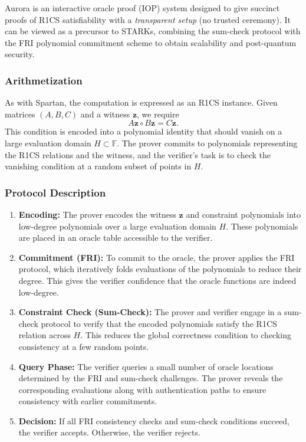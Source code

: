 Aurora is an interactive oracle proof (IOP) system designed to give succinct proofs of R1CS satisfiability with a \emph{transparent setup} (no trusted ceremony). 
It can be viewed as a precursor to STARKs, combining the sum-check protocol with the FRI polynomial commitment scheme to obtain scalability and post-quantum security. 

\subsubsection*{Arithmetization}

As with Spartan, the computation is expressed as an R1CS instance. 
Given matrices $(A,B,C)$ and a witness $\mathbf{z}$, we require 
\[
A\mathbf{z} \circ B\mathbf{z} = C\mathbf{z}.
\]
This condition is encoded into a polynomial identity that should vanish on a large evaluation domain $H \subset \mathbb{F}$. 
The prover commits to polynomials representing the R1CS relations and the witness, and the verifier’s task is to check the vanishing condition at a random subset of points in $H$.

\subsubsection*{Protocol Description}

\begin{protocol}
\begin{enumerate}
  \item \textbf{Encoding:}  
  The prover encodes the witness $\mathbf{z}$ and constraint polynomials into low-degree polynomials over a large evaluation domain $H$. 
  These polynomials are placed in an oracle table accessible to the verifier.

  \item \textbf{Commitment (FRI):}  
  To commit to the oracle, the prover applies the FRI protocol, which iteratively folds evaluations of the polynomials to reduce their degree. 
  This gives the verifier confidence that the oracle functions are indeed low-degree.

  \item \textbf{Constraint Check (Sum-Check):}  
  The prover and verifier engage in a sum-check protocol to verify that the encoded polynomials satisfy the R1CS relation across $H$. 
  This reduces the global correctness condition to checking consistency at a few random points.

  \item \textbf{Query Phase:}  
  The verifier queries a small number of oracle locations determined by the FRI and sum-check challenges. 
  The prover reveals the corresponding evaluations along with authentication paths to ensure consistency with earlier commitments.

  \item \textbf{Decision:}  
  If all FRI consistency checks and sum-check conditions succeed, the verifier accepts. 
  Otherwise, the verifier rejects.
\end{enumerate}
\end{protocol}


